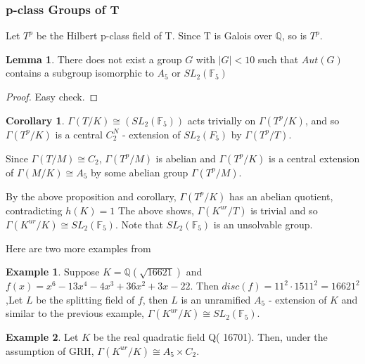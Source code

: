 \documentclass[12pt]{extarticle}
\newcommand{\Q}{\mathbb{Q}}
\newcommand{\<}{\langle}
\renewcommand{\>}{\rangle}
\theoremstyle{definition}
\newtheorem{corollary}{Corollary}
\newtheorem*{example}{Example}
\newtheorem{lemma}{Lemma}
\begin{document}
\subsubsection{p-class Groups of T}

Let $T^p$ be the Hilbert p-class field of T. Since T is Galois over $\Q$, so is $T^p$.
\begin{lemma}
There does not exist a group $G$ with $|G| < 10 $ such that $Aut(G)$ contains a subgroup isomorphic to $A_5$ or $SL_2(\mathbb{F}_5)$
\end{lemma}
\begin{proof}
Easy check. 
\end{proof}
\begin{corollary}
 $\Gamma(T/K) \cong (SL_2(\mathbb{F}_5))$ acts trivially on $\Gamma(T^p/K)$, and so $\Gamma(T^p/K)$ is a central $C_2^N$ - extension of $SL_2(F_5)$ by $\Gamma(T^p/T)$. \par
Since $\Gamma(T/M) \cong C_2$, $\Gamma(T^p/M)$ is abelian and $\Gamma(T^p/K)$ is a central extension of $\Gamma(M/K) \cong A_5$ by some abelian group $\Gamma(T^p/M)$.
\end{corollary}
 By the above proposition and corollary, $\Gamma(T^p/K)$ has an abelian quotient, contradicting $h(K)=1$
The above shows, $\Gamma(K^{ur}/T)$ is trivial and so $\Gamma(K^{ur}/K) \cong SL_2(\mathbb{F}_5)$. Note that $SL_2(\mathbb{F}_5)$ is an unsolvable group. 
 \par
Here are two more examples from \cite{KIM2017}
\begin{example}
Suppose $K = \Q(\sqrt{16621})$ and $f(x) = x^6-13x^4-4x^3 +36x^2 +3x-22$. Then $disc(f) = 11^2 \cdot 1511^2 = 16621^2$,Let $L$ be the splitting field of $f$, then $L$ is an unramified $A_5$ - extension of $K$ and similar to the previous example, $\Gamma(K^{ur}/K) \cong SL_2(\mathbb{F}_5)$.
\end{example}
\begin{example}
Let $K$ be the real quadratic field Q( 16701). Then, under the assumption of GRH,  $\Gamma(K^{ur}/K) \cong A_5 \times C_2$.
\end{example}
 
\end{document}
